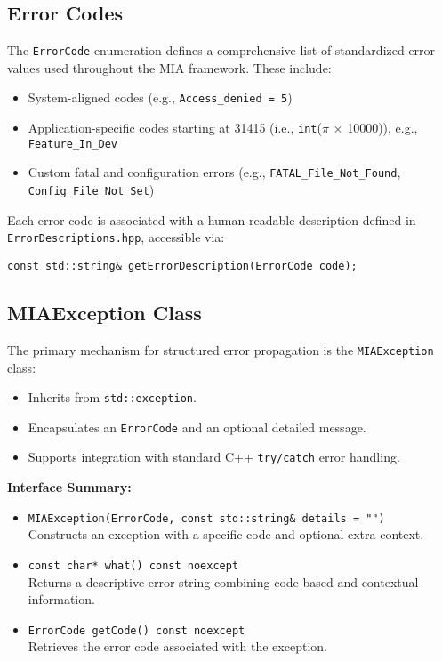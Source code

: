 \subsection*{Error Codes}
The \texttt{ErrorCode} enumeration defines a comprehensive list of standardized error values used throughout the MIA framework. These include:
\begin{itemize}\itemsep0em
	\item System-aligned codes (e.g., \texttt{Access\_denied = 5})
	\item Application-specific codes starting at 31415 (i.e., \texttt{int}($\pi$ × 10000)), e.g., \texttt{Feature\_In\_Dev}
	\item Custom fatal and configuration errors (e.g., \texttt{FATAL\_File\_Not\_Found}, \texttt{Config\_File\_Not\_Set})
\end{itemize}

Each error code is associated with a human-readable description defined in \texttt{ErrorDescriptions.hpp}, accessible via:
\begin{lstlisting}[style=cppstyle]
const std::string& getErrorDescription(ErrorCode code);
\end{lstlisting}

\subsection*{MIAException Class}
The primary mechanism for structured error propagation is the \texttt{MIAException} class:
\begin{itemize}\itemsep0em
	\item Inherits from \texttt{std::exception}.
	\item Encapsulates an \texttt{ErrorCode} and an optional detailed message.
	\item Supports integration with standard C++ \texttt{try/catch} error handling.
\end{itemize}

\textbf{Interface Summary:}
\begin{itemize}\itemsep0em
	\item \texttt{MIAException(ErrorCode, const std::string\& details = "")} \\
	Constructs an exception with a specific code and optional extra context.
	\item \texttt{const char* what() const noexcept} \\
	Returns a descriptive error string combining code-based and contextual information.
	\item \texttt{ErrorCode getCode() const noexcept} \\
	Retrieves the error code associated with the exception.
\end{itemize}

